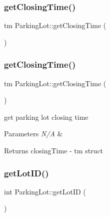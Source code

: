 \subsubsection{\texorpdfstring{get\+Closing\+Time()}{getClosingTime()}\hspace{0.1cm}{\footnotesize\ttfamily [1/2]}}
{\footnotesize\ttfamily tm Parking\+Lot\+::get\+Closing\+Time (\begin{DoxyParamCaption}{ }\end{DoxyParamCaption})}

\mbox{\label{class_parking_lot_a645ab3d930184975d74814aea73cd684}} 
\subsubsection{\texorpdfstring{get\+Closing\+Time()}{getClosingTime()}\hspace{0.1cm}{\footnotesize\ttfamily [2/2]}}
{\footnotesize\ttfamily tm Parking\+Lot\+::get\+Closing\+Time (\begin{DoxyParamCaption}{ }\end{DoxyParamCaption})}



get parking lot closing time 


\begin{DoxyParams}{Parameters}
{\em N/A} & \\
\hline
\end{DoxyParams}
\begin{DoxyReturn}{Returns}
closing\+Time -\/ tm struct 
\end{DoxyReturn}
\mbox{\label{class_parking_lot_ac6269a82ab516553047cefacc229e5e0}} 
\subsubsection{\texorpdfstring{get\+Lot\+I\+D()}{getLotID()}\hspace{0.1cm}{\footnotesize\ttfamily [1/2]}}
{\footnotesize\ttfamily int Parking\+Lot\+::get\+Lot\+ID (\begin{DoxyParamCaption}{ }\end{DoxyParamCaption})}

